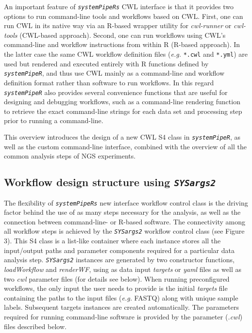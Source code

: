 \documentclass[14pt,]{article}
\begin{document}
An important feature of \emph{\texttt{systemPipeR\textquotesingle{}s}} CWL interface is that it provides two
options to run command-line tools and workflows based on CWL. First, one can
run CWL in its native way via an R-based wrapper utility for \emph{cwl-runner} or
\emph{cwl-tools} (CWL-based approach). Second, one can run workflows using CWL's
command-line and workflow instructions from within R (R-based approach). In the
latter case the same CWL workflow definition files (\emph{e.g.} \texttt{*.cwl} and \texttt{*.yml})
are used but rendered and executed entirely with R functions defined by
\emph{\texttt{systemPipeR}}, and thus use CWL mainly as a command-line and workflow
definition format rather than software to run workflows. In this regard
\emph{\texttt{systemPipeR}} also provides several convenience functions that are useful for
designing and debugging workflows, such as a command-line rendering function to
retrieve the exact command-line strings for each data set and processing step
prior to running a command-line.

This overview introduces the design of a new CWL S4 class in \emph{\texttt{systemPipeR}},
as well as the custom command-line interface, combined with the overview of all
the common analysis steps of NGS experiments.

\hypertarget{workflow-design-structure-using-sysargs2}{%
\subsection{\texorpdfstring{Workflow design structure using \emph{\texttt{SYSargs2}}}{Workflow design structure using SYSargs2}}\label{workflow-design-structure-using-sysargs2}}

The flexibility of \emph{\texttt{systemPipeR\textquotesingle{}s}} new interface workflow control class is the driving factor behind
the use of as many steps necessary for the analysis, as well as the connection
between command-line- or R-based software. The connectivity among all
workflow steps is achieved by the \emph{\texttt{SYSargs2}} workflow control class (see Figure 3).
This S4 class is a list-like container where each instance stores all the
input/output paths and parameter components required for a particular data
analysis step. \emph{\texttt{SYSargs2}} instances are generated by two constructor
functions, \emph{loadWorkflow} and \emph{renderWF}, using as data input \emph{targets} or
\emph{yaml} files as well as two \emph{cwl} parameter files (for details see below). When
running preconfigured workflows, the only input the user needs to provide is
the initial \emph{targets} file containing the paths to the input files (\emph{e.g.}
FASTQ) along with unique sample labels. Subsequent targets instances are
created automatically. The parameters required for running command-line
software is provided by the parameter (\emph{.cwl}) files described below.
\end{document}

